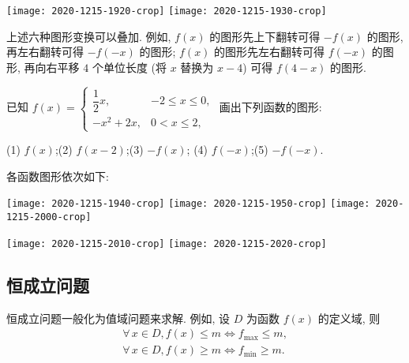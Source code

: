     \begin{center}
        \texttt{[image: 2020-1215-1920-crop]}\qquad
        \texttt{[image: 2020-1215-1930-crop]}
    \end{center}

上述六种图形变换可以叠加. 例如, $f(x)$ 的图形先上下翻转可得 $-f(x)$ 的图形, 再左右翻转可得 $-f(-x)$ 的图形; $f(x)$ 的图形先左右翻转可得 $f(-x)$ 的图形, 再向右平移 $4$ 个单位长度 (将 $x$ 替换为 $x-4$) 可得 $f(4-x)$ 的图形.

\begin{example}
    已知 $f(x)=\begin{cases}
        \dfrac12 x,& -2\leqslant x\leqslant 0,\\
        -x^2+2x,& 0<x\leqslant 2,
    \end{cases}$ 画出下列函数的图形:
    
    (1) $f(x)$;\qquad (2) $f(x-2)$;\qquad (3) $-f(x)$;\qquad 
    (4) $f(-x)$;\qquad (5) $-f(-x)$.
\end{example}
\begin{solution}
    各函数图形依次如下:
    
    \begin{center}
        \texttt{[image: 2020-1215-1940-crop]}\qquad
        \texttt{[image: 2020-1215-1950-crop]}\qquad
        \texttt{[image: 2020-1215-2000-crop]}
    \end{center}
    
    \begin{center}
        \texttt{[image: 2020-1215-2010-crop]}\qquad
        \texttt{[image: 2020-1215-2020-crop]}
    \end{center}
\end{solution}

\subsection{恒成立问题}

恒成立问题一般化为值域问题来求解. 例如, 设 $D$ 为函数 $f(x)$ 的定义域, 则
\[\begin{gathered}
    \forall\, x\in D, f(x)\leqslant m\Leftrightarrow f_{\max}\leqslant m,\\
    \forall\, x\in D, f(x)\geqslant m\Leftrightarrow f_{\min}\geqslant m.
\end{gathered}\]

